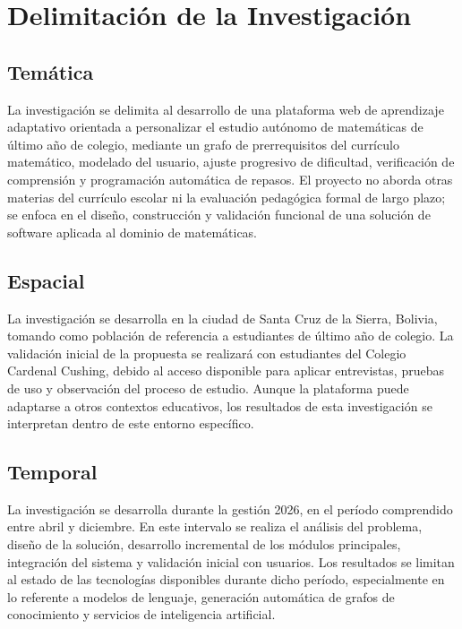 \documentclass{univalle-perfil}
\begin{document}
\section{Delimitación de la Investigación}

\subsection{Temática}

La investigación se delimita al desarrollo de una plataforma web de aprendizaje adaptativo orientada a personalizar el estudio autónomo de matemáticas de último año de colegio, mediante un grafo de prerrequisitos del currículo matemático, modelado del usuario, ajuste progresivo de dificultad, verificación de comprensión y programación automática de repasos. El proyecto no aborda otras materias del currículo escolar ni la evaluación pedagógica formal de largo plazo; se enfoca en el diseño, construcción y validación funcional de una solución de software aplicada al dominio de matemáticas.

\subsection{Espacial}

La investigación se desarrolla en la ciudad de Santa Cruz de la Sierra, Bolivia, tomando como población de referencia a estudiantes de último año de colegio. La validación inicial de la propuesta se realizará con estudiantes del Colegio Cardenal Cushing, debido al acceso disponible para aplicar entrevistas, pruebas de uso y observación del proceso de estudio. Aunque la plataforma puede adaptarse a otros contextos educativos, los resultados de esta investigación se interpretan dentro de este entorno específico.

\subsection{Temporal}

La investigación se desarrolla durante la gestión 2026, en el período comprendido entre abril y diciembre. En este intervalo se realiza el análisis del problema, diseño de la solución, desarrollo incremental de los módulos principales, integración del sistema y validación inicial con usuarios. Los resultados se limitan al estado de las tecnologías disponibles durante dicho período, especialmente en lo referente a modelos de lenguaje, generación automática de grafos de conocimiento y servicios de inteligencia artificial.
\end{document}
